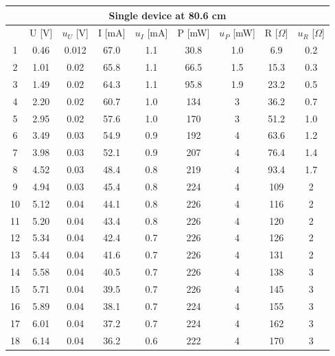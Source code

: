 \documentclass[a4paper,12pt]{article}
\begin{document}
\begin{table}[H]
\begin{center}
\begin{tabular}{|c|c|c|c|c|c|c|c|c|}
\hline
\multicolumn{9}{|c|}{Single device at 80.6 cm} \\ \hline
 & U {[}V{]} & $u_U$ {[}V{]} & I {[}mA{]} & $u_I$ {[}mA{]} & P {[}mW{]} & $u_P$ {[}mW{]} & R {[}$\Omega${]} & $u_R$ {[}$\Omega${]} \\ \hline
 1     & 0.46  & 0.012  & 67.0  & 1.1   & 30.8  & 1.0   & 6.9   & 0.2  \\ \hline
    2     & 1.01  & 0.02  & 65.8  & 1.1   & 66.5  & 1.5   & 15.3  & 0.3  \\ \hline
    3     & 1.49  & 0.02  & 64.3  & 1.1   & 95.8  & 1.9   & 23.2  & 0.5  \\ \hline
    4     & 2.20  & 0.02  & 60.7  & 1.0   & 134   & 3     & 36.2  & 0.7  \\ \hline
    5     & 2.95  & 0.02  & 57.6  & 1.0   & 170   & 3     & 51.2  & 1.0  \\ \hline
    6     & 3.49  & 0.03  & 54.9  & 0.9   & 192   & 4     & 63.6  & 1.2  \\ \hline
    7     & 3.98  & 0.03  & 52.1  & 0.9   & 207   & 4     & 76.4  & 1.4  \\ \hline
    8     & 4.52  & 0.03  & 48.4  & 0.8   & 219   & 4     & 93.4  & 1.7  \\ \hline
    9     & 4.94  & 0.03  & 45.4  & 0.8   & 224   & 4     & 109   & 2  \\ \hline
    10    & 5.12  & 0.04  & 44.1  & 0.8   & 226   & 4     & 116   & 2  \\ \hline
    11    & 5.20  & 0.04  & 43.4  & 0.8   & 226   & 4     & 120   & 2  \\ \hline
    12    & 5.34  & 0.04  & 42.4  & 0.7   & 226   & 4     & 126   & 2  \\ \hline
    13    & 5.44  & 0.04  & 41.6  & 0.7   & 226   & 4     & 131   & 2  \\ \hline
    14    & 5.58  & 0.04  & 40.5  & 0.7   & 226   & 4     & 138   & 3  \\ \hline
    15    & 5.71  & 0.04  & 39.5  & 0.7   & 226   & 4     & 145   & 3  \\ \hline
    16    & 5.89  & 0.04  & 38.1  & 0.7   & 224   & 4     & 155   & 3  \\ \hline
    17    & 6.01  & 0.04  & 37.2  & 0.7   & 224   & 4     & 162   & 3  \\ \hline
    18    & 6.14  & 0.04  & 36.2  & 0.6   & 222   & 4     & 170   & 3  \\ \hline

\end{tabular}
\end{center}
\end{table}
\end{document}
